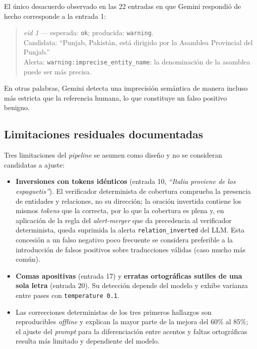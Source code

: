 El único desacuerdo observado en las 22 entradas en que Gemini respondió de
hecho corresponde a la entrada 1:

\begin{quote}
	\textit{eid 1} --- esperada: \texttt{ok}; producida: \texttt{warning}.\\
	Candidata: ``Punjab, Pakistán, está dirigido por la Asamblea Provincial del
	Punjab.''\\
	Alerta: \texttt{warning:imprecise\_entity\_name}: la denominación de la
	asamblea puede ser más precisa.
\end{quote}

En otras palabras, Gemini detecta una imprecisión semántica de manera incluso
más estricta que la referencia humana, lo que constituye un falso positivo
benigno.

\subsection{Limitaciones residuales documentadas}

Tres limitaciones del \textit{pipeline} se asumen como diseño y no se
consideran candidatas a ajuste:

\begin{itemize}
	\item \textbf{Inversiones con tokens idénticos} (entrada 10, \textit{``Italia
		      proviene de los espaguetis''}). El verificador determinista de cobertura
	      comprueba la presencia de entidades y relaciones, no su dirección; la oración
	      invertida contiene los mismos \textit{tokens} que la correcta, por lo que la
	      cobertura es plena y, en aplicación de la regla del \textit{alert-merger}
	      que da precedencia al verificador determinista, queda suprimida la
	      alerta \texttt{relation\_inverted} del LLM. Esta concesión a un falso negativo
	      poco frecuente se considera preferible a la introducción de falsos positivos
	      sobre traducciones válidas (caso mucho más común).
	\item \textbf{Comas apositivas} (entrada 17) y \textbf{erratas ortográficas sutiles
		      de una sola letra} (entrada 20). Su detección depende del modelo y exhibe
	      varianza entre pases con \texttt{temperature 0.1}.
	\item Las correcciones deterministas de los tres primeros hallazgos son reproducibles
	      \textit{offline} y explican la mayor parte de la mejora del 60\% al 85\%; el
	      ajuste del \textit{prompt} para la diferenciación entre acentos y faltas
	      ortográficas resulta más limitado y dependiente del modelo.
\end{itemize}


